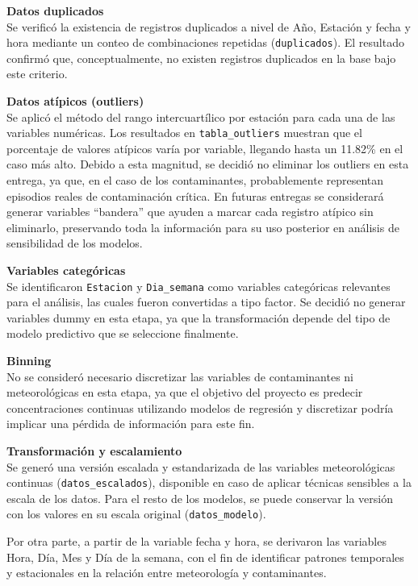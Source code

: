 \documentclass[
  letterpaper,
  DIV=11,
  numbers=noendperiod]{scrartcl}
\begin{document}
\textbf{Datos duplicados}\\
Se verificó la existencia de registros duplicados a nivel de Año,
Estación y fecha y hora mediante un conteo de combinaciones repetidas
(\texttt{duplicados}). El resultado confirmó que, conceptualmente, no
existen registros duplicados en la base bajo este criterio.

\textbf{Datos atípicos (outliers)}\\
Se aplicó el método del rango intercuartílico por estación para cada una
de las variables numéricas. Los resultados en \texttt{tabla\_outliers}
muestran que el porcentaje de valores atípicos varía por variable,
llegando hasta un 11.82\% en el caso más alto. Debido a esta magnitud,
se decidió no eliminar los outliers en esta entrega, ya que, en el caso
de los contaminantes, probablemente representan episodios reales de
contaminación crítica. En futuras entregas se considerará generar
variables ``bandera'' que ayuden a marcar cada registro atípico sin
eliminarlo, preservando toda la información para su uso posterior en
análisis de sensibilidad de los modelos.

\textbf{Variables categóricas}\\
Se identificaron \texttt{Estacion} y \texttt{Dia\_semana} como variables
categóricas relevantes para el análisis, las cuales fueron convertidas a
tipo factor. Se decidió no generar variables dummy en esta etapa, ya que
la transformación depende del tipo de modelo predictivo que se
seleccione finalmente.

\textbf{Binning}\\
No se consideró necesario discretizar las variables de contaminantes ni
meteorológicas en esta etapa, ya que el objetivo del proyecto es
predecir concentraciones continuas utilizando modelos de regresión y
discretizar podría implicar una pérdida de información para este fin.

\textbf{Transformación y escalamiento}\\
Se generó una versión escalada y estandarizada de las variables
meteorológicas continuas (\texttt{datos\_escalados}), disponible en caso
de aplicar técnicas sensibles a la escala de los datos. Para el resto de
los modelos, se puede conservar la versión con los valores en su escala
original (\texttt{datos\_modelo}).

Por otra parte, a partir de la variable fecha y hora, se derivaron las
variables Hora, Día, Mes y Día de la semana, con el fin de identificar
patrones temporales y estacionales en la relación entre meteorología y
contaminantes.
\end{document}
